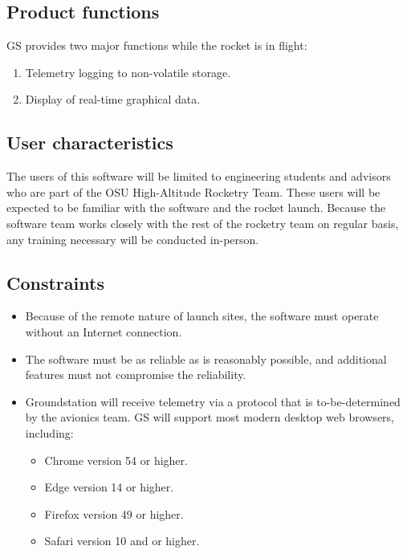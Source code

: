 \documentclass[10pt,draftclsnofoot,onecolumn]{IEEEtran}
\begin{document}
	\subsection{Product functions}
	GS provides two major functions while the rocket is in flight:

	\begin{enumerate}
		\item Telemetry logging to non-volatile storage.
		\item Display of real-time graphical data.
	\end{enumerate}

	\subsection{User characteristics}
	The users of this software will be limited to engineering students and advisors who are part of the OSU High-Altitude
	Rocketry Team.
	These users will be expected to be familiar with the software and the rocket launch.
	Because the software team works closely with the rest of the rocketry team on regular basis,
	any training necessary will be conducted in-person.

	\subsection{Constraints}
	\begin{itemize}
		\item Because of the remote nature of launch sites, the software must operate without an Internet connection.
		\item The software must be as reliable as is reasonably possible, and additional features must not compromise the reliability.
		\item Groundstation will receive telemetry via a protocol that is to-be-determined by the avionics team.
	GS will support most modern desktop web browsers, including:
	\begin{itemize}
			\item Chrome version 54 or higher.
			\item Edge version 14 or higher.
			\item Firefox version 49 or higher.
			\item Safari version 10 and or higher.
		\end{itemize}

	\end{itemize}
\end{document}
